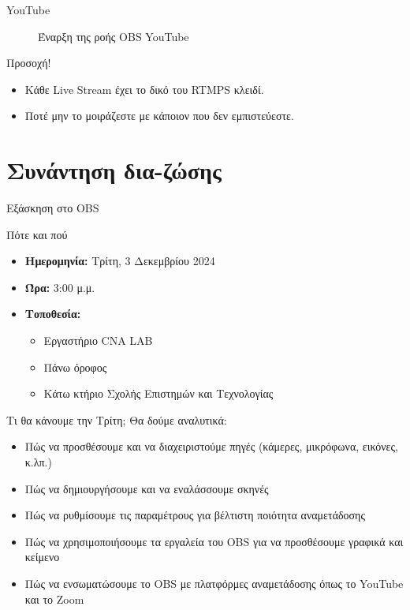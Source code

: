 \documentclass[aspectratio=169]{beamer}
\begin{document}
\begin{frame}[allowframebreaks]{YouTube}
\begin{figure}
    \caption{Έναρξη της ροής OBS \rightarrow YouTube}
    \label{fig:obs2youtube}
  \end{figure}
\begin{alertblock}{Προσοχή!}
  \begin{itemize}
    \item Κάθε Live Stream έχει το δικό του RTMPS κλειδί.
    \item Ποτέ μην το μοιράζεστε με κάποιον που δεν εμπιστεύεστε.
  \end{itemize}
\end{alertblock}
\end{frame}

\section{Συνάντηση δια-ζώσης}
\begin{frame}[allowframebreaks]{Εξάσκηση στο OBS}
  \begin{alertblock}{Πότε και πού}
    \begin{itemize}
      \item \textbf{Ημερομηνία:} Τρίτη, 3 Δεκεμβρίου 2024
      \item \textbf{Ώρα:} 3:00 μ.μ.
      \item \textbf{Τοποθεσία:}
            \begin{itemize}
              \item Εργαστήριο CNA LAB
              \item Πάνω όροφος
              \item Κάτω κτήριο Σχολής Επιστημών και Τεχνολογίας
            \end{itemize}
    \end{itemize}
  \end{alertblock}
  \begin{exampleblock}{Τι θα κάνουμε την Τρίτη;}
    Θα δούμε αναλυτικά:
    \begin{itemize}
      \item Πώς να προσθέσουμε και να διαχειριστούμε πηγές (κάμερες, μικρόφωνα, εικόνες, κ.λπ.)
      \item Πώς να δημιουργήσουμε και να εναλάσσουμε σκηνές
      \item Πώς να ρυθμίσουμε τις παραμέτρους για βέλτιστη ποιότητα αναμετάδοσης
      \item Πώς να χρησιμοποιήσουμε τα εργαλεία του OBS για να προσθέσουμε γραφικά και κείμενο
      \item Πώς να ενσωματώσουμε το OBS με πλατφόρμες αναμετάδοσης όπως το YouTube και το Zoom

\end{itemize}
\end{exampleblock}
\end{frame}
\end{document}
